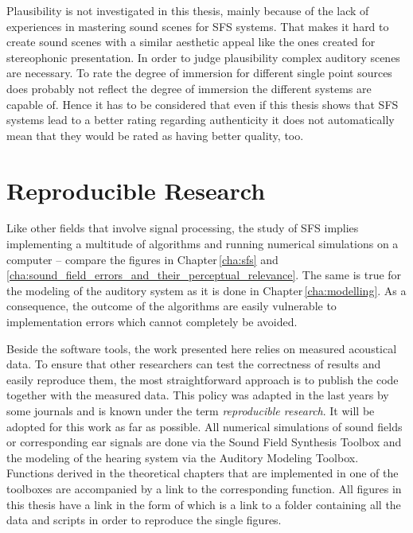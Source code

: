 Plausibility is not investigated in this thesis, mainly because of the lack
of experiences in mastering sound scenes for \ac{SFS} systems. That makes
it hard to create sound scenes with a similar aesthetic appeal like the ones
created for stereophonic presentation. In order to judge plausibility complex
auditory scenes are necessary. To rate the degree of immersion for different
single point sources does probably not reflect the degree of immersion the
different systems are capable of.
Hence it has to be considered that even if this thesis shows that
\ac{SFS} systems lead to a better rating regarding authenticity it does not
automatically mean that they would be rated as having better quality, too.


\section{Reproducible Research}
\label{sec:reproducible_research}
%
Like other fields that involve signal processing, the study of \ac{SFS}
implies implementing a multitude of algorithms and running numerical simulations
on a computer -- compare the figures in
Chapter\,\ref{cha:sfs} and
\ref{cha:sound_field_errors_and_their_perceptual_relevance}. The same is true for
the modeling of the auditory system as it is done in
Chapter\,\ref{cha:modelling}.
As a consequence, the outcome of the algorithms are easily vulnerable to
implementation errors which cannot completely be
avoided.

Beside the software tools, the work presented here relies on measured acoustical
data.
To ensure that other
researchers can test the correctness of results and easily reproduce them,
the most straightforward approach is to publish the code together with the
measured data.
This policy was adapted in the last years by some journals and is known under the
term \emph{reproducible research}.
It will be adopted for this work as far as possible. All numerical
simulations of sound fields or corresponding ear signals are done via the Sound
Field Synthesis
Toolbox and the modeling of
the hearing system via the Auditory Modeling
Toolbox.
Functions derived in the theoretical chapters that are implemented in one of the
toolboxes are accompanied by a link to the corresponding function. All figures in
this thesis have a link in the form of \reproduce{\GITHUBBASE} which is a link to a
folder containing all the data and scripts in order to reproduce the single
figures.



